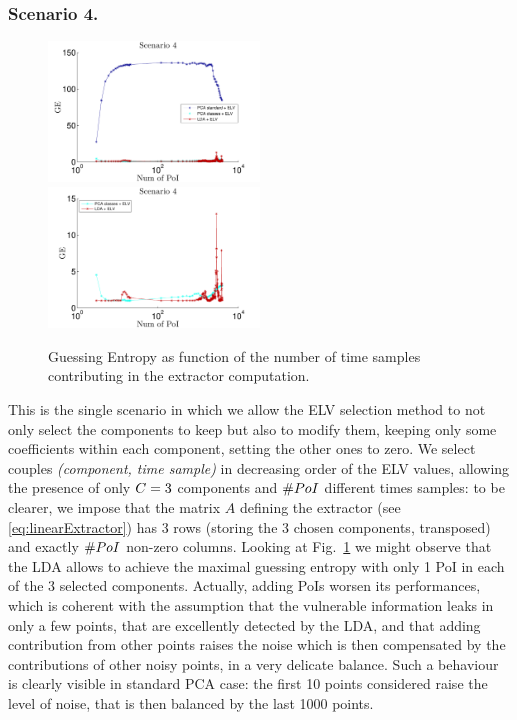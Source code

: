 \subsubsection{Scenario 4.}
\begin{figure}
\includegraphics[width=0.5\textwidth]{figures/Criterion4.pdf}
\includegraphics[width=0.5\textwidth]{figures/Criterion4cutted.pdf} 
\caption{Guessing Entropy as function of the number of time samples contributing in the extractor computation.}\label{fig:4}
\end{figure}

This is the single scenario in which we allow the ELV selection method to not only select the components to keep but also to modify them, keeping only some coefficients within each component, setting the other ones to zero. We select couples \textit{(component, time sample)} in decreasing order of the ELV values, allowing the presence of only $C = 3$ components and $\# PoI$ different times samples: to be clearer, we impose that the matrix $A$ defining the extractor (see \eqref{eq:linearExtractor}) has 3 rows (storing the 3 chosen components, transposed) and exactly $\# PoI$ non-zero columns.
Looking at Fig.~\ref{fig:4} we might observe that the LDA allows to achieve the maximal guessing entropy with only 1 PoI in each of the 3 selected components. 
Actually, adding PoIs worsen its performances, which is coherent with the assumption that the vulnerable information leaks in only a few points, that are excellently detected by the LDA, and that adding contribution from other points raises the noise which is then compensated by the contributions of other noisy points, in a very delicate balance. Such a behaviour is clearly visible in standard PCA case: the first 10 points considered raise the level of noise, that is then balanced by the last 1000 points.

